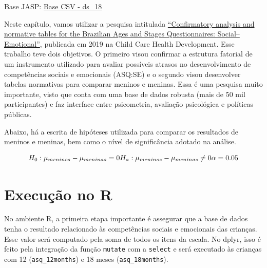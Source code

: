\documentclass[
]{book}
\newenvironment{Shaded}{\begin{snugshade}}{\end{snugshade}}
\newcommand{\DataTypeTok}[1]{\textcolor[rgb]{0.13,0.29,0.53}{#1}}
\newcommand{\KeywordTok}[1]{\textcolor[rgb]{0.13,0.29,0.53}{\textbf{#1}}}
\newcommand{\NormalTok}[1]{#1}
\newcommand{\OperatorTok}[1]{\textcolor[rgb]{0.81,0.36,0.00}{\textbf{#1}}}
\newcommand{\OtherTok}[1]{\textcolor[rgb]{0.56,0.35,0.01}{#1}}
\newcommand{\StringTok}[1]{\textcolor[rgb]{0.31,0.60,0.02}{#1}}
\begin{document}
Base JASP: \href{https://github.com/anovabr/mqt/raw/master/bases/bases_csv_jasp.zip}{Base CSV - ds\_18}

Neste capítulo, vamos utilizar a pesquisa intitulada \href{https://onlinelibrary.wiley.com/doi/abs/10.1111/cch.12649}{``Confirmatory analysis and normative tables for the Brazilian Ages and Stages Questionnaires: Social--Emotional''}, publicada em 2019 na Child Care Health Development. Esse trabalho teve dois objetivos. O primeiro visou confirmar a estrutura fatorial de um instrumento utilizado para avaliar possíveis atrasos no desenvolvimento de competências sociais e emocionais (ASQ:SE) e o segundo visou desenvolver tabelas normativas para comparar meninos e meninas. Essa é uma pesquisa muito importante, visto que conta com uma base de dados robusta (mais de 50 mil participantes) e faz interface entre psicometria, avaliação psicológica e políticas públicas.

Abaixo, há a escrita de hipóteses utilizada para comparar os resultados de meninos e meninas, bem como o nível de significância adotado na análise.

\[H_0: \mu_{meninos} - \mu_{meninas} = 0 \\ H_a: \mu_{meninos} - \mu_{meninas} \neq 0 \\ \alpha = 0.05\]

\hypertarget{execuuxe7uxe3o-no-r-3}{%
\section{Execução no R}\label{execuuxe7uxe3o-no-r-3}}

No ambiente R, a primeira etapa importante é assegurar que a base de dados tenha o resultado relacionado às competências sociais e emocionais das crianças. Esse valor será computado pela soma de todos os itens da escala. No dplyr, isso é feito pela integração da função \texttt{mutate} com a \texttt{select} e será executado às crianças com 12 (\texttt{asq\_12months}) e 18 meses (\texttt{asq\_18months}).

\begin{Shaded}
\end{Shaded}
\end{document}
